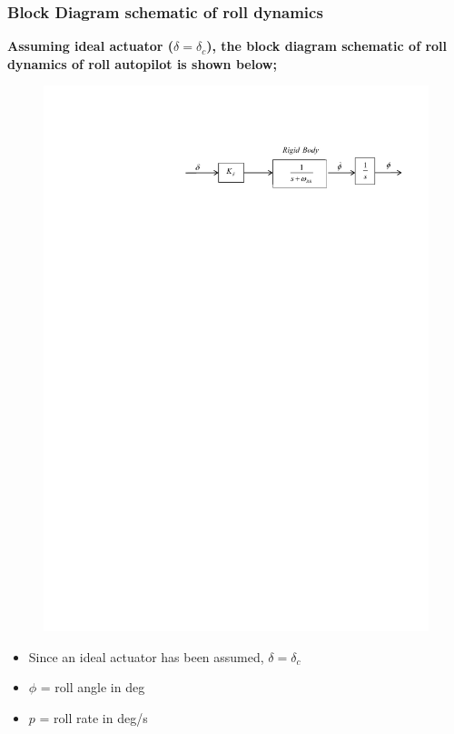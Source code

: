 \documentclass[table,10pt,red]{beamer}	%
\begin{document}
	\begin{frame}
	\frametitle{Block Diagram schematic of roll dynamics}
	\textbf{Assuming ideal actuator ($\delta=\delta_c$), the block diagram schematic of roll dynamics of roll autopilot is shown below;}
	\begin{figure}
	\includegraphics[width=0.8\linewidth]{fig1}
	\end{figure}
	 	\begin{itemize}  %
		\item Since an ideal actuator has been assumed, $\delta=\delta_c$
		\item $\phi$ = roll angle in deg
		\item $p$ = roll rate in deg/s
	\end{itemize}
\end{frame}
\end{document}
